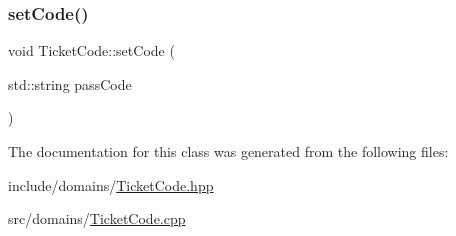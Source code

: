 \subsubsection{\texorpdfstring{setCode()}{setCode()}}
{\footnotesize\ttfamily void Ticket\+Code\+::set\+Code (\begin{DoxyParamCaption}\item[{std\+::string}]{pass\+Code }\end{DoxyParamCaption})}



The documentation for this class was generated from the following files\+:\begin{DoxyCompactItemize}
\item 
include/domains/\mbox{\hyperlink{_ticket_code_8hpp}{Ticket\+Code.\+hpp}}\item 
src/domains/\mbox{\hyperlink{domains_2_ticket_code_8cpp}{Ticket\+Code.\+cpp}}\end{DoxyCompactItemize}
